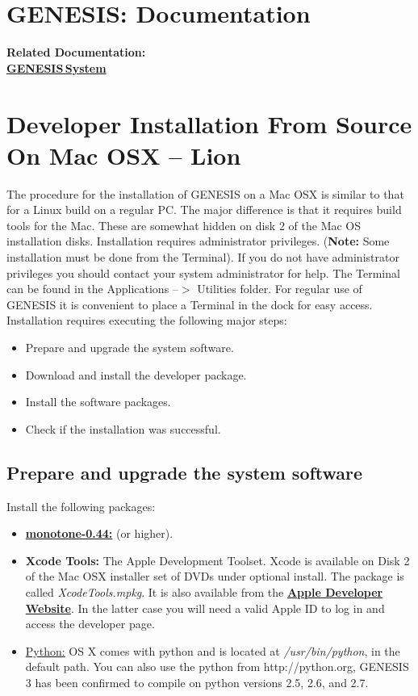 \documentclass[12pt]{article}
\begin{document}
\section*{GENESIS: Documentation}

{\bf Related Documentation:} \\
\href{../genesis-system/genesis-system.tex}{\bf GENESIS\,System}


\section*{Developer Installation From Source On Mac OSX -- Lion}

The procedure for the installation of GENESIS on a Mac OSX is similar to that for a Linux build on a regular PC. The major difference is that it requires build tools for the Mac. These are somewhat hidden on disk 2 of the Mac OS installation disks. Installation requires administrator privileges. ({\bf Note:} Some installation must be done from the Terminal). If you do not have administrator privileges you should contact your system administrator for help. The Terminal can be found in the Applications --$>$ Utilities folder. For regular use of GENESIS it is convenient to place a Terminal in the dock for easy access.
Installation requires executing the following major steps:
\begin{itemize}
   \item[] Prepare and upgrade the system software.
   \item[] Download and install the developer package.
   \item[] Install the software packages.
   \item[] Check if the installation was successful. 
\end{itemize}

\subsection*{Prepare and upgrade the system software}

Install the following packages:
\begin{itemize}
   \item[]\href{http://monotone.ca/}{\bf monotone-0.44:} (or higher).
   \item[]{\bf Xcode Tools:} The Apple Development Toolset. Xcode is available on Disk 2 of the Mac OSX installer set of DVDs under optional install. The package is called {\it  XcodeTools.mpkg}. It is also available from the \href{http://developer.apple.com/technology/xcode.html}{\bf Apple Developer Website}. In the latter case  you will need a valid Apple ID to log in and access the developer page.
   
  \item[]\href{http://python.org/}{Python:} OS X comes with python and is located at {\it /usr/bin/python}, in the default path. You can also use the python from http://python.org, GENESIS 3 has been confirmed to compile on python versions 2.5, 2.6, and 2.7. 
\end{itemize}
   
\end{document}

